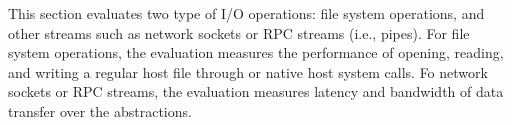\label{sec:eval:pal:stream}

This section
evaluates two type of I/O operations:
file system operations,
and other streams such as network sockets or RPC streams (i.e., pipes).
For file system operations,
the evaluation
measures the performance of opening, reading, and writing a regular host file through \hostapis{} or native host system calls.
Fo network sockets or RPC streams,
the evaluation measures 
latency and bandwidth of data transfer over the abstractions.







